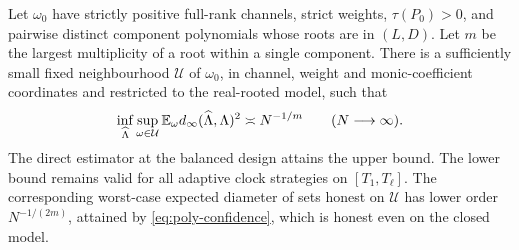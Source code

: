 \begin{theorem}
\label{thm:multiplicity}
Let $\omega_0$ have strictly positive full-rank channels, strict weights,
$\tau(P_0)>0$, and pairwise distinct component polynomials whose roots
are in $(L,D)$. Let $m$ be the largest multiplicity of a root within a
single component. There is a sufficiently small fixed neighbourhood
$\mathcal U$ of $\omega_0$, in channel, weight and monic-coefficient
coordinates and restricted to the real-rooted model, such that
\begin{equation}\label{eq:local-minimax}
 \inf_{\widehat\Lambda}\sup_{\omega\in\mathcal U}
     \mathbb E_\omega d_\infty(\widehat\Lambda,\Lambda)^2
       \asymp N^{-1/m}\qquad(N\longrightarrow\infty).
\end{equation}
The direct estimator at the balanced design attains the upper bound.
The lower bound remains valid for all adaptive clock strategies on
$[T_1,T_\ell]$. The corresponding worst-case expected diameter of
sets honest on $\mathcal U$ has lower order $N^{-1/(2m)}$, attained
by \eqref{eq:poly-confidence}, which is honest even on the closed model.
\end{theorem}
